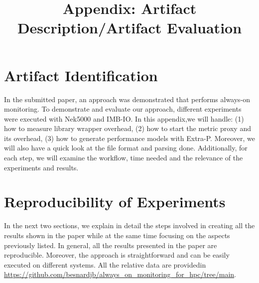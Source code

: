 \documentclass[sigconf,nonacm=true]{acmart}
\title[On Enabling Continuous Optimization for HPC Workloads]{Appendix: Artifact Description/Artifact Evaluation}
\begin{document}
\acmPrice{}
\acmDOI{}
\acmISBN{}

\sloppy
\maketitle


\renewcommand{\shortauthors}{ JB. Besnard and A. Tarraf }

\section*{Artifact Identification}
In the submitted paper, an approach was demonstrated that performs always-on monitoring. To demonstrate and evaluate our approach, 
different experiments were executed with Nek5000 and IMB-IO. In this appendix,we will 
handle: 
(1) how to measure library wrapper overhead,
(2) how to start the metric proxy and its overhead, 
(3) how to generate performance models with Extra-P. 
Moreover, we will also have a quick look at the file format and parsing done. 
Additionally, for each step, we will examine the workflow, time needed and the relevance 
of the experiments and results.

\section*{Reproducibility of Experiments}
In the next two sections, we explain in detail the steps involved in creating all the results shown in the paper while 
at the same time focusing on the aspects previously listed. In general, all 
the results presented in the paper are reproducible. Moreover, 
the approach is straightforward and can be easily executed 
on different systems. All the relative data are providedin \url{https://github.com/besnardjb/always\_on\_monitoring\_for\_hpc/tree/main}.







\end{document}
